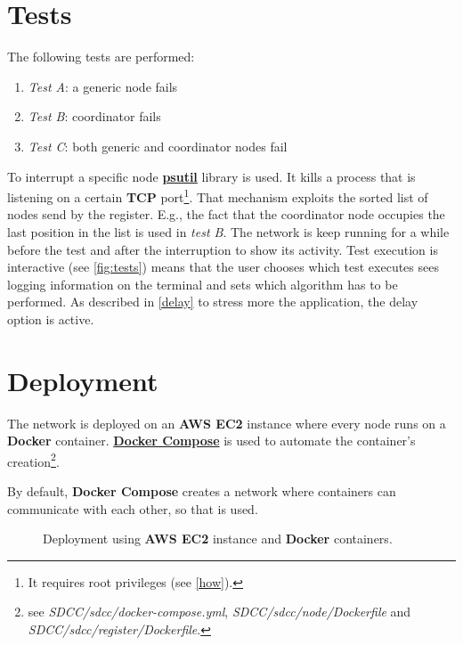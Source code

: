 \documentclass[conference]{IEEEtran}
\begin{document}
\section{Tests}\label{sec:tests}

The following tests are performed:

\begin{enumerate}
    \item \textit{Test A}: a generic node fails
    \item \textit{Test B}: coordinator fails
    \item \textit{Test C}: both generic and coordinator nodes fail
\end{enumerate}

To interrupt a specific node \href{https://pypi.org/project/psutil/}{\textbf{psutil}} library is used. It kills a process that is listening on a certain \textbf{TCP} port\footnote{It requires root privileges (see \ref{how}).}. That mechanism exploits the sorted list of nodes send by the register. E.g., the fact that the coordinator node occupies the last position in the list is used in \textit{test B}. 
The network is keep running for a while before the test and after the interruption to show its activity.  
Test execution is interactive (see \ref{fig:tests}) means that the user chooses which test executes sees logging information on the terminal and sets which algorithm has to be performed.
As described in \ref{delay} to stress more the application, the delay option is active.

\section{Deployment}

The network is deployed on an \textbf{AWS EC2} instance where every node runs on a \textbf{Docker} container. 
\href{https://docs.docker.com/compose/}{\textbf{Docker Compose}} is used to automate the container's creation\footnote{see \textit{SDCC/sdcc/docker-compose.yml},  \textit{SDCC/sdcc/node/Dockerfile} and \textit{SDCC/sdcc/register/Dockerfile}.}. 

By default, \textbf{Docker Compose} creates a network where containers can communicate with each other, so that is used. 

\begin{figure}[htbp]\label{fig:arch}
  \centering
  
  \caption{Deployment using \textbf{AWS EC2} instance and \textbf{Docker} containers.}
\end{figure}
\end{document}
